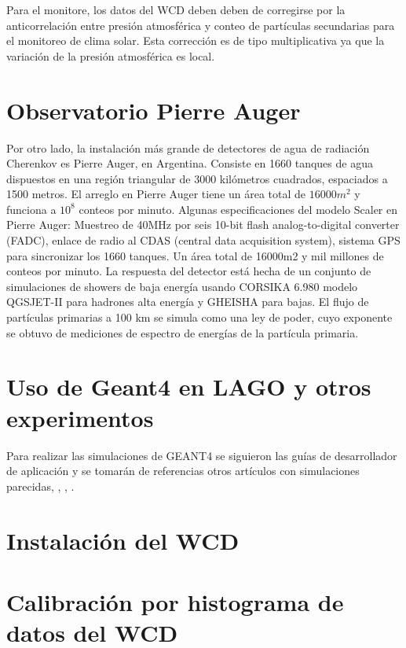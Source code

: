 \documentclass{book}
\begin{document}
Para el monitore, los datos del WCD deben deben de corregirse por la anticorrelaci\'on entre presi\'on atmosf\'erica y conteo de part\'iculas secundarias para el monitoreo de clima solar. Esta correcci\'on es de tipo multiplicativa ya que la variaci\'on de la presi\'on atmosf\'erica es local. \citep{Yunior} \citep{ASOREY}

\section{Observatorio Pierre Auger}

Por otro lado, la instalaci\'on m\'as grande de detectores de agua de radiaci\'on Cherenkov es Pierre Auger, en Argentina. Consiste en 1660 tanques de agua dispuestos en una regi\'on triangular de 3000 kil\'ometros cuadrados, espaciados a 1500 metros. El arreglo en Pierre Auger tiene un \'area total de $16000m^{2}$ y funciona a $10^8$ conteos por minuto. Algunas especificaciones del modelo Scaler en Pierre Auger: Muestreo de 40MHz por seis 10-bit flash analog-to-digital converter (FADC), enlace de radio al CDAS (central data acquisition system), sistema GPS para sincronizar los 1660 tanques. Un \'area total de 16000m2 y mil millones de conteos por minuto. La respuesta del detector est\'a hecha de un conjunto de simulaciones de showers de baja energ\'ia usando CORSIKA 6.980 modelo QGSJET-II para hadrones alta energ\'ia y GHEISHA para bajas. El flujo de part\'iculas primarias a 100 km se simula como una ley de poder, cuyo exponente se obtuvo de mediciones de espectro de energ\'ias de la part\'icula primaria. \citep{VILLASENOR}

\section{Uso de Geant4 en LAGO y otros experimentos}

Para realizar las simulaciones de GEANT4 se siguieron las gu\'ias de desarrollador de aplicaci\'on y se tomar\'an de referencias otros art\'iculos con simulaciones parecidas, \citep{NIELSEN}, \citep{CHEN}, \citep{CALDERON}.



\section{Instalaci\'on del WCD}

\section{Calibraci\'on por histograma de datos del WCD}
\end{document}
